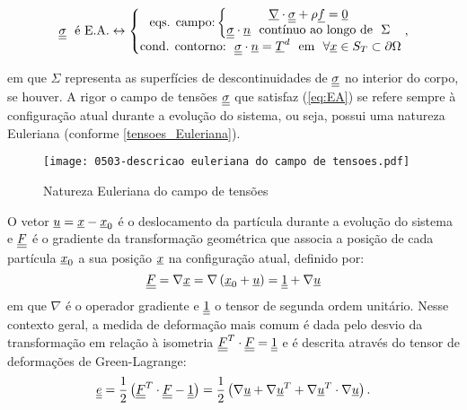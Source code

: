 \begin{equation}
	\label{eq:EA}
	\underline{\underline \sigma}~~ \text{é E.A.} \leftrightarrow \left\{
		\begin{matrix}
			\text{eqs. campo:} \left\{
				\begin{matrix}
					\underline \nabla \cdot \underline{\underline \sigma}+ \rho \underline f = \underline 0 \\ 
					\underline{\underline \sigma} \cdot \underline n ~~ \text{contínuo ao longo de} ~~ \Sigma
		
				\end{matrix}\right. \\ 
			\text{cond. contorno:}~~ \underline{\underline \sigma} \cdot \underline n = \underline T^d ~~ \text{em} ~~ \forall \underline x \in S_T \subset \partial \Omega
		\end{matrix}\right.,
\end{equation}

em que $\Sigma$  representa as superfícies de descontinuidades de $\underline{\underline \sigma}$ no interior do corpo, se houver. A rigor o campo de tensões $\underline{\underline \sigma}$ que satisfaz (\ref{eq:EA}) se refere sempre à configuração atual durante a evolução do sistema, ou seja, possui uma natureza Euleriana (conforme \autoref{tensoes_Euleriana}).

\begin{figure}[H]
	\begin{center}
		\texttt{[image: 0503-descricao euleriana do campo de tensoes.pdf]}
	\end{center}
	\caption{\label{tensoes_Euleriana}Natureza Euleriana do campo de tensões}
\end{figure}

O vetor $\underline u = \underline x - \underline x_0$ é o deslocamento da partícula durante a evolução do sistema e $\underline{\underline F}$ é o gradiente da transformação geométrica que associa a posição de cada partícula $\underline x_0$ a sua posição $\underline x$ na configuração atual, definido por:
\begin{equation}
	\label{eq:transformacao_geometrica}
 	\underline{\underline F} = \nabla \underline x = \nabla \left( \underline x_0+\underline u \right) = \underline{\underline 1} + \nabla \underline u
\end{equation}
em que $\nabla$ é o operador gradiente e $\underline{\underline 1}$ o tensor de segunda ordem unitário. Nesse contexto geral, a medida de deformação mais comum é dada pelo desvio da transformação em relação à isometria $\underline{\underline F}^T \cdot \underline{\underline F} = \underline{\underline 1}$ e é descrita através do tensor de deformações de Green-Lagrange:
\begin{equation}
	\label{eq:green_lagrange}
	\underline{\underline e} = \frac{1}{2} \left(\underline{\underline F}^T \cdot \underline{\underline F} - \underline{\underline 1} \right) = \frac{1}{2} \left(\nabla \underline u + \nabla\underline u^T + \nabla\underline u^T \cdot \nabla \underline u \right).
\end{equation}

